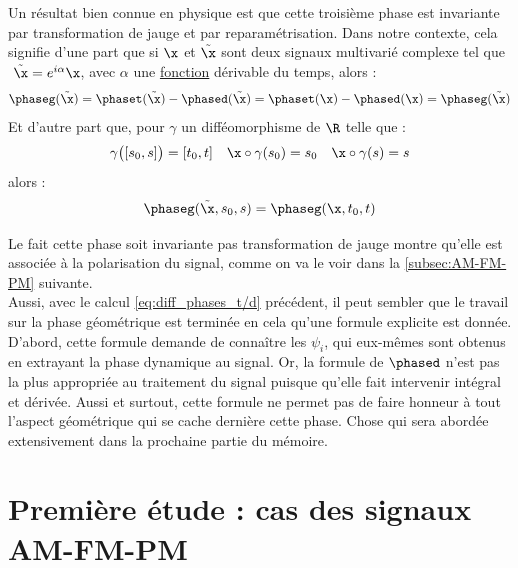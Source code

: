 Un résultat bien connue en physique \cite{bohm_geometric_2003,mukunda_quantum_1993,nakahara_geometry_2003} est que cette troisième phase est invariante par transformation de jauge et par reparamétrisation. Dans notre contexte, cela signifie d'une part que si $\x$ et $\Tilde{\x}$ sont deux signaux multivarié complexe tel que $\ \Tilde{\x} = e^{i\alpha}\x$, avec $\alpha$ une \underline{fonction} dérivable du temps, alors :
\begin{align*}
	\phaseg(\Tilde{\x}) &= \phaset(\Tilde{\x}) - \phased(\Tilde{\x})  = \phaset(\x) - \phased(\x) = \phaseg(\Tilde{\x})\\
\end{align*}
Et d'autre part que, pour $\gamma$ un difféomorphisme de $\R$ telle que :
\begin{align*}
	\gamma \big( [s_0,s] \big) &= [t_0,t]  & \x\circ\gamma(s_0)&=s_0  &  \x \circ\gamma(s) = s
\end{align*}
alors :
\[\phaseg(\Tilde{\x}, s_0,s) = \phaseg(\x, t_0,t)\]
\skipl


Le fait cette phase soit invariante pas transformation de jauge montre qu'elle est associée à la polarisation du signal, comme on va le voir dans la \cref{subsec:AM-FM-PM} suivante. 
\\
Aussi, avec le calcul \eqref{eq:diff_phases_t/d} précédent, il peut sembler que le travail sur la phase géométrique est terminée en cela qu'une formule explicite est donnée. 
D'abord, cette formule demande de connaître les $\psi_i$, qui eux-mêmes sont obtenus en extrayant la phase dynamique au signal. 
Or, la formule de $\phased$ n'est pas la plus appropriée au traitement du signal puisque qu'elle fait intervenir intégral et dérivée. 
Aussi et surtout, cette formule ne permet pas de faire honneur à tout l'aspect géométrique qui se cache dernière cette phase. 
Chose qui sera abordée extensivement dans la prochaine partie du mémoire.
\\



\section{Première étude : cas des signaux AM-FM-PM} \label{sec:AM-FM-PM}

